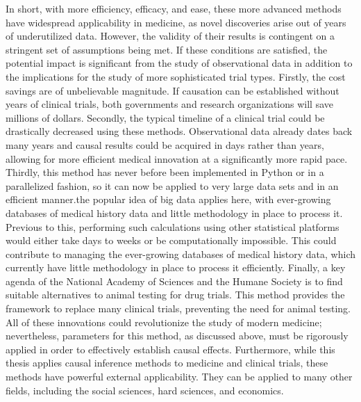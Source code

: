 In short, with more efficiency, efficacy, and ease, these more advanced methods have widespread applicability in medicine, as novel discoveries arise out of years of underutilized data.  However, the validity of their results is contingent on a stringent set of assumptions being met.  If these conditions are satisfied, the potential impact is significant from the study of observational data in addition to the implications for the study of more sophisticated trial types.  Firstly, the cost savings are of unbelievable magnitude.  If causation can be established without years of clinical trials, both governments and research organizations will save millions of dollars.  Secondly, the typical timeline of a clinical trial could be drastically decreased using these methods.  Observational data already dates back many years and causal results could be acquired in days rather than years, allowing for more efficient medical innovation at a significantly more rapid pace.  Thirdly, this method has never before been implemented in Python or in a parallelized fashion, so it can now be applied to very large data sets and in an efficient manner.the popular idea of big data applies here, with ever-growing databases of medical history data and little methodology in place to process it.  Previous to this, performing such calculations using other statistical platforms would either take days to weeks or be computationally impossible. This could contribute to managing the ever-growing databases of medical history data, which currently have little methodology in place to process it efficiently.  Finally, a key agenda of the National Academy of Sciences and the Humane Society is to find suitable alternatives to animal testing for drug trials.\cite{avoidinganimaltesting}   This method provides the framework to replace many clinical trials, preventing the need for animal testing.  All of these innovations could revolutionize the study of modern medicine; nevertheless, parameters for this method, as discussed above, must be rigorously applied in order to effectively establish causal effects.  Furthermore, while this thesis applies causal inference methods to medicine and clinical trials, these methods have powerful external applicability. They can be applied to many other fields, including the social sciences, hard sciences, and economics.  



